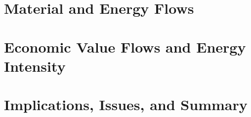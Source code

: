 \documentclass[graybox,envcountchap,sectrefs]{svmono}
\begin{document}


\part{Material and Energy Flows}
\label{part:matter}







\part{Economic Value Flows and Energy Intensity}
\label{part:values}

 

 

\part{Implications, Issues, and Summary}
\label{part:implications}










\begin{appendices}
	
	

	

	

	

	

\end{appendices}

\backmatter%
%
%



\glstoctrue{} %
\printglossary[type=glossary, style=glossarystyle, nonumberlist=true]



\printindex{}

\end{document}
